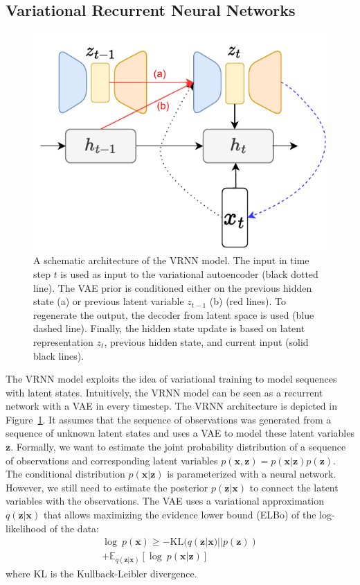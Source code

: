 \subsection{Variational Recurrent Neural Networks}
\label{02:sec:vrnn}
\begin{figure}
    \centering
    \includegraphics{images/DVRNN.pdf}
    \caption{A schematic architecture of the VRNN model. The input in time step $t$ is used as input to the variational autoencoder (black dotted line). The VAE prior is conditioned either on the previous hidden state (a) or previous latent variable $z_{t-1}$ (b) (red lines). To regenerate the output, the decoder from latent space is used (blue dashed line). Finally, the hidden state update is based on latent representation $z_t$, previous hidden state, and current input (solid black lines).}
    \label{fig:DVRNN}
\end{figure}
The VRNN model \cite{chung2015recurrent} exploits the idea of variational training to model sequences with latent states.
Intuitively, the VRNN model can be seen as a recurrent network with a VAE in every timestep.
The VRNN architecture is depicted in Figure~\ref{fig:DVRNN}.
It assumes that the sequence of observations was generated from a sequence of unknown latent states and uses a VAE to model these latent variables $\mathbf{z}$.
Formally, we want to estimate the joint probability distribution of a sequence of observations and corresponding latent variables $p(\mathbf{x}, \mathbf{z}) = p(\mathbf{x}|\mathbf{z})p(\mathbf{z})$.
The conditional distribution $p(\mathbf{x}|\mathbf{z})$ is parameterized with a neural network.
However, we still need to estimate the posterior $p(\mathbf{z}|\mathbf{x})$ to connect the latent variables with the observations.
The VAE uses a variational approximation $q(\mathbf{z}|\mathbf{x})$ that allows maximizing the evidence lower bound (ELBo) of the log-likelihood of the data:
\begin{equation}
\begin{split}
    \log~p(\mathbf{x}) \ge -\mathrm{KL}(q(\mathbf{z}|\mathbf{x})||p(\mathbf{z}))\\ + \mathbb{E}_{q(\mathbf{z}|\mathbf{x})}[\log~p(\mathbf{x}|\mathbf{z})]
    \label{eq:vae}
\end{split}
\end{equation}
where KL is the Kullback-Leibler divergence.

